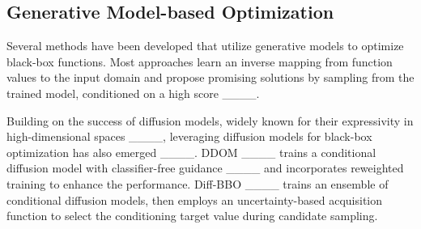 

\subsection{Generative Model-based Optimization}



Several methods have been developed that utilize generative models to optimize black-box functions. Most approaches learn an inverse mapping from function values to the input domain and propose promising solutions by sampling from the trained model, conditioned on a high score ____.


Building on the success of diffusion models, widely known for their expressivity in high-dimensional spaces ____, leveraging diffusion models for black-box optimization has also emerged 
____. 
DDOM ____ trains a conditional diffusion model with classifier-free guidance ____ and incorporates reweighted training to enhance the performance. 
Diff-BBO ____ trains an ensemble of conditional diffusion models, then employs an uncertainty-based acquisition function to select the conditioning target value during candidate sampling.


